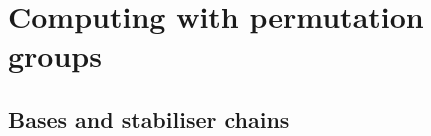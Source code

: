 \documentclass[handout]{beamer}
\begin{document}

\section{Computing with permutation groups}

\subsection{Bases and stabiliser chains}
\end{document}

